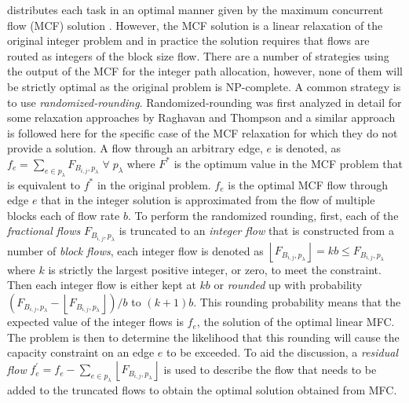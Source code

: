 \name distributes each task in an optimal manner given by the maximum concurrent flow (MCF) solution \cite{reed2012traffic}. However, the MCF solution is a linear relaxation of the original integer problem and in practice the solution requires that flows are routed as integers of the block size flow. There are a number of strategies using the output of the MCF for the integer path allocation, however, none of them will be strictly optimal as the original problem is NP-complete. A common strategy is to use \emph{randomized-rounding}. Randomized-rounding was first analyzed in detail for some relaxation approaches by Raghavan and Thompson \cite{Raghavan1987} and a similar approach is followed here for the specific case of the MCF relaxation for which they do not provide a solution. A flow through an arbitrary edge, \(e\) is denoted, as \(f_e=\sum_{e \in p_\lambda} F_{B_{i,j},p_\lambda} \; \forall \; p_\lambda\) where $F^*$ is the optimum value in the MCF problem that is equivalent to $f^*$ in the original problem. $f_e$ is the optimal MCF flow through edge $e$ that in the integer solution is approximated from the flow of multiple blocks each of flow rate $b$. To perform the randomized rounding, first, each of the \emph{fractional flows}  $F_{B_{i,j},p_\lambda}$ is truncated to an \emph{integer flow} that is constructed from a number of\emph{ block flows}, each integer flow is denoted as $\left \lfloor F_{B_{i,j},p_\lambda} \right \rfloor = kb \leq F_{B_{i,j},p_\lambda}$ where $k$ is strictly the largest positive integer, or zero, to meet the constraint. Then each integer flow is either kept at $kb$ or \emph{rounded} up with probability $(F_{B_{i,j},p_\lambda} - \left \lfloor{F_{B_{i,j},p_\lambda}} \right \rfloor)/b$ to $(k+1)b$. This rounding probability means that the expected value of the integer flows is $f_e$, the solution of the optimal linear MFC. The problem is then to determine the likelihood that this rounding will cause the capacity constraint on an edge $e$ to be exceeded. To aid the discussion, a \emph{residual flow}  $f^\prime_e=f_e - \sum_{e \in p_\lambda} \left \lfloor{F_{B_{i,j},p_\lambda}} \right \rfloor $ is used to describe the flow that needs to be added to the truncated flows to obtain the optimal solution obtained from MFC.

